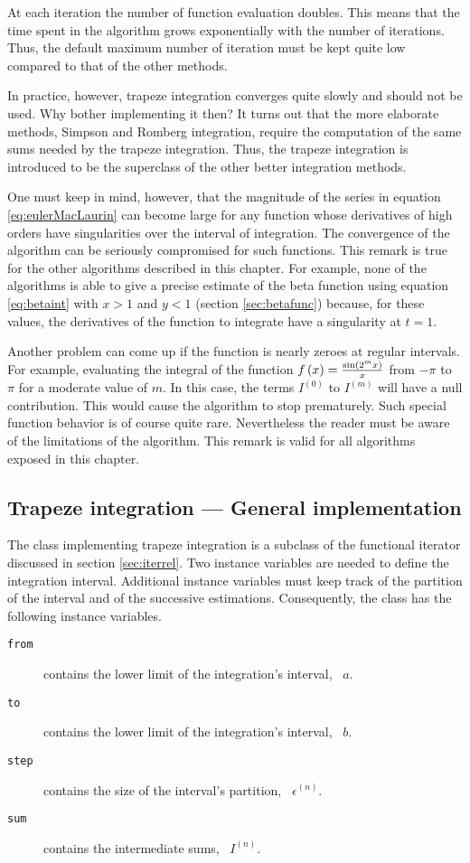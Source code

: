 \documentclass[twoside]{book}
\begin{document}
At each iteration the number of function evaluation doubles. This
means that the time spent in the algorithm grows exponentially
with the number of iterations. Thus, the default maximum number of
iteration must be kept quite low compared to that of the other
methods.

In practice, however, trapeze integration converges quite slowly
and should not be used. Why bother implementing it then? It turns
out that the more elaborate methods, Simpson and Romberg
integration, require the computation of the same sums needed by
the trapeze integration. Thus, the trapeze integration is
introduced to be the superclass of the other better integration
methods.

One must keep in mind, however, that the magnitude of the series
in equation \ref{eq:eulerMacLaurin} can become large for any
function whose derivatives of high orders have singularities over
the interval of integration. The convergence of the algorithm can
be seriously compromised for such functions. This remark is true
for the other algorithms described in this chapter. For example,
none of the algorithms is able to give a precise estimate of the
beta function using equation \ref{eq:betaint} with $x>1$ and $y<1$
(\cf section \ref{sec:betafunc}) because, for these values, the
derivatives of the function to integrate have a singularity at
$t=1$.

Another problem can come up if the function is nearly zeroes at
regular intervals. For example, evaluating the integral of the
function $f\left(x\right)={\sin\left(2^mx\right)\over x}$  from
$-\pi$ to $\pi$ for a moderate value of $m$. In this case, the
terms $I^{\left(0\right)}$ to $I^{\left(m\right)}$ will have a
null contribution. This would cause the algorithm to stop
prematurely. Such special function behavior is of course quite
rare. Nevertheless the reader must be aware of the limitations of
the algorithm. This remark is valid for all algorithms exposed in
this chapter.

\subsection{Trapeze integration --- General implementation}
The class implementing trapeze
integration is a subclass of the functional iterator discussed in
section \ref{sec:iterrel}. Two instance variables are needed to
define the integration interval. Additional instance variables
must keep track of the partition of the interval and of the
successive estimations. Consequently, the class has the following
instance variables.
\begin{description}
\item[\tt from] contains the lower limit of the integration's interval,
 \ie\ $a$.
\item[\tt to] contains the lower limit of the integration's interval,
 \ie\ $b$.
\item[\tt step] contains the size of the interval's partition,
 \ie\ $\epsilon^{\left(n\right)}$.
\item[\tt sum] contains the intermediate sums, \ie\ $I^{\left(n\right)}$.
\end{description}
\end{document}
